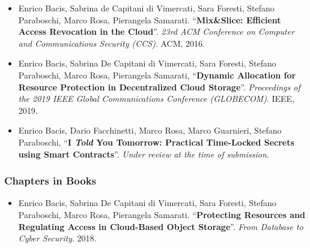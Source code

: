 {\begin{itemize}
	\item Enrico Bacis, Sabrina de Capitani di Vimercati, Sara Foresti, Stefano Paraboschi, Marco Rosa, Pierangela Samarati. ``\textbf{Mix\&Slice: Efficient Access Revocation in the Cloud}''. {\em 23rd ACM Conference on Computer and Communications Security (CCS)}. ACM, 2016.
	
	
	
	
	
	\item Enrico Bacis, Sabrina De Capitani di Vimercati, Sara Foresti, Stefano Paraboschi, Marco Rosa, Pierangela Samarati, ``\textbf{Dynamic Allocation for Resource Protection in Decentralized Cloud Storage}''. {\em Proceedings of the 2019 IEEE Global Communications Conference (GLOBECOM)}. IEEE, 2019.
	
	\item Enrico Bacis, Dario Facchinetti, Marco Rosa, Marco Guarnieri, Stefano Paraboschi, ``\textbf{I {\em Told} You Tomorrow: Practical Time-Locked Secrets using Smart Contracts}''. {\em Under review at the time of submission}.
\end{itemize}

\subsubsection*{Chapters in Books}
\begin{itemize}
	\item  Enrico Bacis,	Sabrina De Capitani di Vimercati, Sara Foresti,	Stefano Paraboschi,	Marco Rosa,	Pierangela Samarati. ``\textbf{Protecting Resources and Regulating Access in Cloud-Based Object Storage}''. {\em From Database to Cyber Security}. 2018.
\end{itemize}

} %